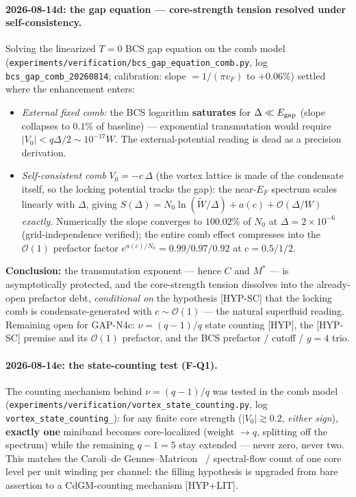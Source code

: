 \paragraph{2026-08-14d: the gap equation --- core-strength tension resolved under
self-consistency.} Solving the linearized $T=0$ BCS gap equation on the comb model
(\texttt{experiments/\allowbreak verification/\allowbreak bcs\_\allowbreak gap\_\allowbreak equation\_\allowbreak comb.py}, log
\texttt{bcs\_gap\_comb\_20260814}; calibration: slope $= 1/(\pi v_F)$ to $+0.06\%$)
settled where the enhancement enters:
\begin{itemize}
\item \emph{External fixed comb:} the BCS logarithm \textbf{saturates} for
$\Delta \ll E_{\rm gap}$ (slope collapses to $0.1\%$ of baseline) --- exponential
transmutation would require $|V_0| < q\Delta/2 \sim 10^{-17}W$. The external-potential
reading is dead as a precision derivation.
\item \emph{Self-consistent comb} $V_0 = -c\,\Delta$ (the vortex lattice is made of the
condensate itself, so the locking potential tracks the gap): the near-$E_F$ spectrum
scales linearly with $\Delta$, giving $S(\Delta) = N_0\ln(\tilde W/\Delta) + a(c) +
\mathcal{O}(\Delta/W)$ \emph{exactly}. Numerically the slope converges to
$\mathbf{100.02\%}$ of $N_0$ at $\Delta = 2\times10^{-6}$ (grid-independence verified);
the entire comb effect compresses into the $\mathcal{O}(1)$ prefactor factor
$e^{a(c)/N_0} = 0.99/0.97/0.92$ at $c = 0.5/1/2$.
\end{itemize}
\textbf{Conclusion:} the transmutation exponent --- hence $C$ and $M^*$ --- is
asymptotically protected, and the core-strength tension dissolves into the already-open
prefactor debt, \emph{conditional on} the hypothesis [HYP-SC] that the locking comb is
condensate-generated with $c \sim \mathcal{O}(1)$ --- the natural superfluid reading.
Remaining open for GAP-N4c: $\nu = (q-1)/q$ state counting [HYP], the [HYP-SC] premise
and its $\mathcal{O}(1)$ prefactor, and the BCS prefactor / cutoff / $g=4$ trio.

\paragraph{2026-08-14e: the state-counting test (F-Q1).} The counting mechanism behind
$\nu = (q-1)/q$ was tested in the comb model
(\texttt{experiments/\allowbreak verification/\allowbreak vortex\_\allowbreak state\_\allowbreak counting.py}, log
\texttt{vortex\_\allowbreak state\_\allowbreak counting\_}): for any finite core strength
($|V_0| \gtrsim 0.2$, \emph{either sign}), \textbf{exactly one} miniband becomes
core-localized (weight $\to q$, splitting off the spectrum) while the remaining $q-1=5$
stay extended --- never zero, never two. This matches the Caroli--de Gennes--Matricon~\cite{cdgm1964} /
spectral-flow count of one core level per unit winding per channel: the filling
hypothesis is upgraded from bare assertion to a CdGM-counting mechanism [HYP+LIT].

